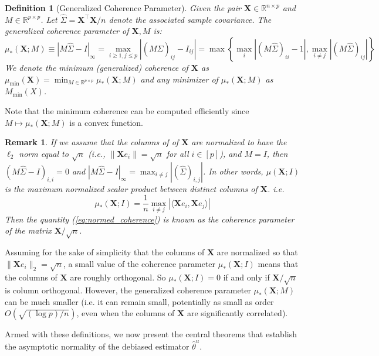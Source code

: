 \documentclass{article}
\newtheorem{definition}[theorem]{Definition}
\newtheorem{remark}[theorem]{Remark}
\begin{document}
\begin{definition}[Generalized Coherence Parameter]
Given the pair $\mathbf{X}\in \mathbb{R}^{n\times p}$ and $M \in \mathbb{R}^{p\times p}$. Let $\hat{\Sigma} = \mathbf{X}^\top\mathbf{X}/n$ denote the associated sample covariance. The generalized coherence parameter of $\mathbf{X}, M$ is: 
\begin{equation}
    \mu_*(\mathbf{X}; M) \equiv |M \hat{\Sigma} - I|_\infty = \max_{i\ge1, j\le p}|(M\hat{\Sigma})_{ij} - I_{ij}| = \max \left\{\max_{i}|(M\hat{\Sigma})_{ii} - 1|, \max_{i\neq j} |(M\hat{\Sigma})_{ij}|\right\}
\end{equation}
We denote the minimum (generalized) coherence of $\mathbf{X}$ as $\mu_{\min}(\mathbf{X}) = \min_{M\in \mathbb{R}^{p\times p}}\mu_*(\mathbf{X}; M)$ and any minimizer of $\mu_*(\mathbf{X}; M)$ as $M_{\text{min}}(X)$. 
\end{definition}
\noindent
Note that the minimum coherence can be computed efficiently since $M \mapsto \mu_*(\mathbf{X}; M)$ is a convex function.
\begin{remark}
If we assume that the columns of of $\mathbf{X}$ are normalized to have the $\ell_2$ norm equal to $\sqrt{n}$ (i.e., $\|\mathbf{X} e_i\| = \sqrt{n}$ for all $i \in [p]$), and $M=I$, then $(M\hat{\Sigma} - I)_{i,i}= 0$ and $|M\hat{\Sigma} - I|_\infty = \max_{i\neq j}|(\hat{\Sigma})_{i,j}|$. In other words, $\mu(\mathbf{X}; I)$ is the maximum normalized scalar product between distinct columns of $\mathbf{X}$. i.e.
\begin{equation}
    \mu_*(\mathbf{X}; I) = \frac{1}{n} \max_{i\neq j}| \langle \mathbf{X}e_i, \mathbf{X}e_j\rangle|
    \label{eq:normed_coherence}
\end{equation}
Then the quantity (\ref{eq:normed_coherence}) is known as the coherence parameter of the matrix $\mathbf{X}/\sqrt{n}$.
\end{remark}
\noindent
Assuming for the sake of simplicity that the columns of $\mathbf{X}$ are normalized so that $\|\mathbf{X}e_i\|_2 = \sqrt{n}$, a small value of the coherence parameter $\mu_*(\mathbf{X}; I)$ means that the columns of $\mathbf{X}$ are roughly orthogonal. So $\mu_*(\mathbf{X}; I) =0$ if and only if $\mathbf{X}/\sqrt{n}$ is column orthogonal. However, the generalized coherence parameter $\mu_*(\mathbf{X}; M)$ can be much smaller (i.e. it can remain small, potentially as small as order $O(\sqrt{(\log p)/n})$, even when the columns of $\mathbf{X}$ are significantly correlated). 

Armed with these definitions, we now present the central theorems that establish the asymptotic normality of the debiased estimator $\hat{\theta}^u$.
\end{document}
